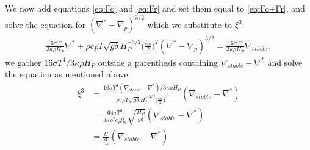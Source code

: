 \documentclass[a4paper,10pt]{article}
\begin{document}
We now add equations \eqref{eq:Fc} and \eqref{eq:Fr} and set them equal to \eqref{eq:Fc+Fr}, and solve the equation for $(\nabla^* - \nabla_p)^{3/2}$ which we substitute to $\xi^3$:
%
\begin{align*}
\frac{16\sigma T^4}{3\kappa \rho H_P}\nabla^* + \rho c_P T \sqrt{g\delta}H_P^{-3/2}\bigg(\frac{l_m}{2}\bigg)^2(\nabla^* - \nabla_p)^{3/2} = \frac{16\sigma T^4}{3\kappa \rho H_P}\nabla_{stable},
\end{align*}
%
we gather $16\sigma T^4/3\kappa \rho H_P$ outside a parenthesis containing $\nabla_{stable} - \nabla^*$ and solve the equation as mentioned above
%
\begin{align}
\xi^3 &= \frac{16\sigma T^4(\nabla_{stable} - \nabla^*)/3\kappa \rho H_P}{\rho c_P T \sqrt{g\delta}H_P^{-3/2}\big(\frac{l_m}{2}\big)^2}(\nabla_{stable} - \nabla^*) \\
&= \frac{64 \sigma T^3}{3\kappa \rho^2 c_P l_m^2}\sqrt{\frac{H_P}{g\delta}}(\nabla_{stable} - \nabla^*)\\
&= \frac{U}{l_m^2}(\nabla_{stable} - \nabla^*) \label{eq:ksi^3}
\end{align}
\end{document}
